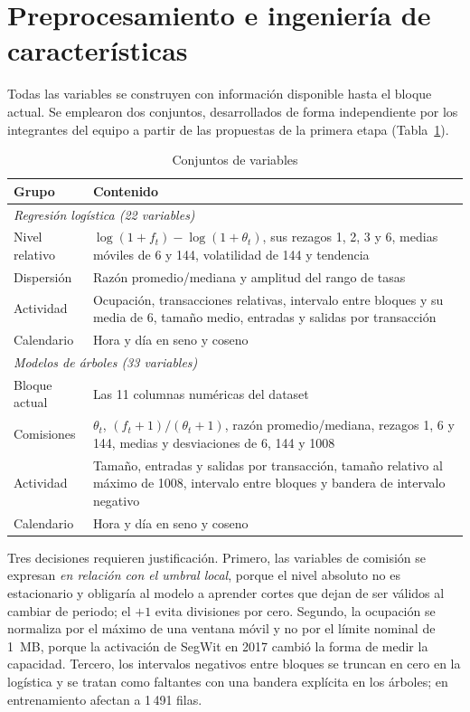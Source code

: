 \documentclass[conference]{IEEEtran}
\begin{document}
\section{Preprocesamiento e ingeniería de características}
Todas las variables se construyen con información disponible hasta el bloque actual. Se emplearon dos conjuntos, desarrollados de forma independiente por los integrantes del equipo a partir de las propuestas de la primera etapa (Tabla~\ref{tab:features}).

\begin{table}[htbp]
\caption{Conjuntos de variables}
\label{tab:features}
\centering
\small
\setlength{\tabcolsep}{3pt}
\begin{tabular}{p{1.6cm}p{6.4cm}}
\toprule
Grupo & Contenido \\
\midrule
\multicolumn{2}{l}{\textit{Regresión logística (22 variables)}} \\
Nivel relativo & $\log(1+f_t)-\log(1+\theta_t)$, sus rezagos 1, 2, 3 y 6, medias móviles de 6 y 144, volatilidad de 144 y tendencia \\
Dispersión & Razón promedio/mediana y amplitud del rango de tasas \\
Actividad & Ocupación, transacciones relativas, intervalo entre bloques y su media de 6, tamaño medio, entradas y salidas por transacción \\
Calendario & Hora y día en seno y coseno \\
\midrule
\multicolumn{2}{l}{\textit{Modelos de árboles (33 variables)}} \\
Bloque actual & Las 11 columnas numéricas del dataset \\
Comisiones & $\theta_t$, $(f_t+1)/(\theta_t+1)$, razón promedio/mediana, rezagos 1, 6 y 144, medias y desviaciones de 6, 144 y 1008 \\
Actividad & Tamaño, entradas y salidas por transacción, tamaño relativo al máximo de 1008, intervalo entre bloques y bandera de intervalo negativo \\
Calendario & Hora y día en seno y coseno \\
\bottomrule
\end{tabular}
\end{table}

Tres decisiones requieren justificación. Primero, las variables de comisión se expresan \emph{en relación con el umbral local}, porque el nivel absoluto no es estacionario y obligaría al modelo a aprender cortes que dejan de ser válidos al cambiar de periodo; el $+1$ evita divisiones por cero. Segundo, la ocupación se normaliza por el máximo de una ventana móvil y no por el límite nominal de 1~MB, porque la activación de SegWit en 2017 cambió la forma de medir la capacidad. Tercero, los intervalos negativos entre bloques se truncan en cero en la logística y se tratan como faltantes con una bandera explícita en los árboles; en entrenamiento afectan a 1\,491 filas.
\end{document}
